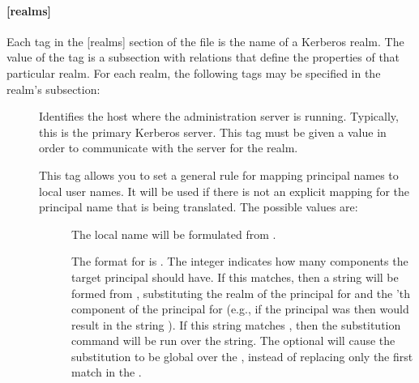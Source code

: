 \documentclass[letterpaper,10pt,english]{sphinxmanual}
\begin{document}
\paragraph{{[}realms{]}}
\label{\detokenize{admin/conf_files/krb5_conf:id2}}\label{\detokenize{admin/conf_files/krb5_conf:realms}}
Each tag in the {[}realms{]} section of the file is the name of a Kerberos
realm.  The value of the tag is a subsection with relations that
define the properties of that particular realm.  For each realm, the
following tags may be specified in the realm’s subsection:
\begin{description}
\item[{}] \leavevmode
Identifies the host where the administration server is running.
Typically, this is the primary Kerberos server.  This tag must be
given a value in order to communicate with the {\hyperref[\detokenize{admin/admin_commands/kadmind:kadmind-8}]{}}
server for the realm.

\item[{}] \leavevmode
This tag allows you to set a general rule for mapping principal
names to local user names.  It will be used if there is not an
explicit mapping for the principal name that is being
translated. The possible values are:
\begin{description}
\item[{}] \leavevmode
The local name will be formulated from .

The format for  is \sphinxstylestrong{{[}}\sphinxstylestrong{:}\sphinxstylestrong{{]}(}\sphinxstylestrong{/}.
The integer  indicates how many components the target
principal should have.  If this matches, then a string will be
formed from , substituting the realm of the principal
for  and the ’th component of the principal for
 (e.g., if the principal was  then
\sphinxcode{{[}2:\$2\$1foo{]}} would result in the string
).  If this string matches , then
the  substitution command will be run over the
string.  The optional  will cause the substitution to be
global over the , instead of replacing only the first
match in the .


\end{description}
\end{description}
\end{document}
